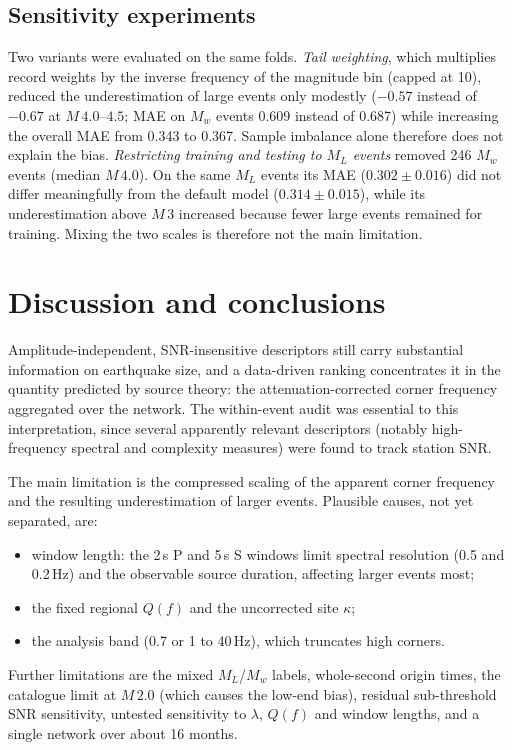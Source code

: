 \documentclass[11pt,a4paper]{article}
\begin{document}
\subsection{Sensitivity experiments}
Two variants were evaluated on the same folds. \emph{Tail weighting}, which
multiplies record weights by the inverse frequency of the magnitude bin
(capped at 10), reduced the underestimation of large events only modestly
($-0.57$ instead of $-0.67$ at $M\,4.0$--$4.5$; MAE on $M_w$ events 0.609 instead
of 0.687) while increasing the overall MAE from 0.343 to 0.367. Sample
imbalance alone therefore does not explain the bias. \emph{Restricting training and testing to $M_L$ events}
removed 246 $M_w$ events (median $M\,4.0$). On the same $M_L$ events its MAE
($0.302\pm0.016$) did not differ meaningfully from the default model
($0.314\pm0.015$), while its underestimation above $M\,3$ increased because
fewer large events remained for training. Mixing the two scales is therefore not
the main limitation.

\section{Discussion and conclusions}

Amplitude-independent, SNR-insensitive descriptors still carry substantial
information on earthquake size, and a data-driven ranking concentrates it in
the quantity predicted by source theory: the attenuation-corrected corner
frequency aggregated over the network. The within-event audit was essential to
this interpretation, since several apparently relevant descriptors (notably
high-frequency spectral and complexity measures) were found to track station
SNR.

The main limitation is the compressed scaling of the apparent corner frequency
and the resulting underestimation of larger events. Plausible causes, not yet
separated, are:
\begin{itemize}
  \item window length: the 2\,s P and 5\,s S windows limit spectral resolution
    (0.5 and 0.2\,Hz) and the observable source duration, affecting larger
    events most;
  \item the fixed regional $Q(f)$ and the uncorrected site $\kappa$;
  \item the analysis band (0.7 or 1 to 40\,Hz), which truncates high corners.
\end{itemize}
Further limitations are the mixed $M_L$/$M_w$ labels, whole-second origin
times, the catalogue limit at $M\,2.0$ (which causes the low-end bias),
residual sub-threshold SNR sensitivity, untested sensitivity to $\lambda$,
$Q(f)$ and window lengths, and a single network over about 16 months.
\end{document}
